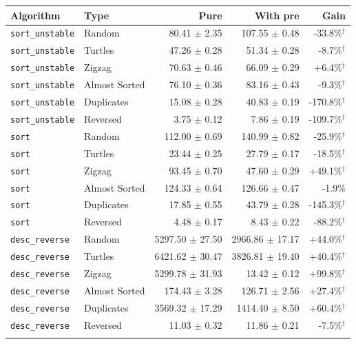 \begin{tabular*}{\textwidth}{@{\extracolsep\fill}llrrr@{\extracolsep\fill}}
\toprule
Algorithm & Type & Pure & With pre & Gain\\
\midrule
\texttt{sort\_unstable} & Random & 80.41 $\pm$ 2.35 & 107.55 $\pm$ 0.48 & -33.8\%$^{\dagger}$ \\
\texttt{sort\_unstable} & Turtles & 47.26 $\pm$ 0.28 & 51.34 $\pm$ 0.28 & -8.7\%$^{\dagger}$ \\
\texttt{sort\_unstable} & Zigzag & 70.63 $\pm$ 0.46 & 66.09 $\pm$ 0.29 & +6.4\%$^{\dagger}$ \\
\texttt{sort\_unstable} & Almost Sorted & 76.10 $\pm$ 0.36 & 83.16 $\pm$ 0.43 & -9.3\%$^{\dagger}$ \\
\texttt{sort\_unstable} & Duplicates & 15.08 $\pm$ 0.28 & 40.83 $\pm$ 0.19 & -170.8\%$^{\dagger}$ \\
\texttt{sort\_unstable} & Reversed & 3.75 $\pm$ 0.12 & 7.86 $\pm$ 0.19 & -109.7\%$^{\dagger}$ \\
\texttt{sort} & Random & 112.00 $\pm$ 0.69 & 140.99 $\pm$ 0.82 & -25.9\%$^{\dagger}$ \\
\texttt{sort} & Turtles & 23.44 $\pm$ 0.25 & 27.79 $\pm$ 0.17 & -18.5\%$^{\dagger}$ \\
\texttt{sort} & Zigzag & 93.45 $\pm$ 0.70 & 47.60 $\pm$ 0.29 & +49.1\%$^{\dagger}$ \\
\texttt{sort} & Almost Sorted & 124.33 $\pm$ 0.64 & 126.66 $\pm$ 0.47 & -1.9\% \\
\texttt{sort} & Duplicates & 17.85 $\pm$ 0.55 & 43.79 $\pm$ 0.28 & -145.3\%$^{\dagger}$ \\
\texttt{sort} & Reversed & 4.48 $\pm$ 0.17 & 8.43 $\pm$ 0.22 & -88.2\%$^{\dagger}$ \\
\texttt{desc\_reverse} & Random & 5297.50 $\pm$ 27.50 & 2966.86 $\pm$ 17.17 & +44.0\%$^{\dagger}$ \\
\texttt{desc\_reverse} & Turtles & 6421.62 $\pm$ 30.47 & 3826.81 $\pm$ 19.40 & +40.4\%$^{\dagger}$ \\
\texttt{desc\_reverse} & Zigzag & 5299.78 $\pm$ 31.93 & 13.42 $\pm$ 0.12 & +99.8\%$^{\dagger}$ \\
\texttt{desc\_reverse} & Almost Sorted & 174.43 $\pm$ 3.28 & 126.71 $\pm$ 2.56 & +27.4\%$^{\dagger}$ \\
\texttt{desc\_reverse} & Duplicates & 3569.32 $\pm$ 17.29 & 1414.40 $\pm$ 8.50 & +60.4\%$^{\dagger}$ \\
\texttt{desc\_reverse} & Reversed & 11.03 $\pm$ 0.32 & 11.86 $\pm$ 0.21 & -7.5\%$^{\dagger}$ \\
\botrule
\end{tabular*}
